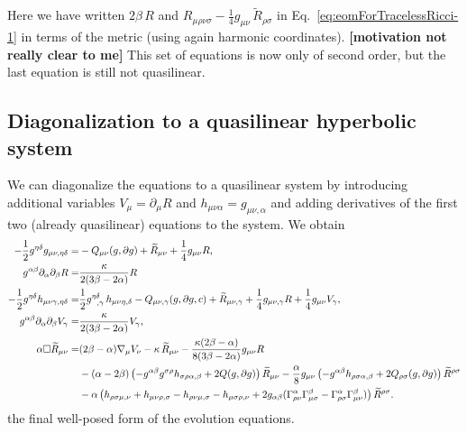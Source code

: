 \documentclass[a4paper,oneside,openany,11pt]{memoir}
\numberwithin{equation}{section} %
\newcommand{\aaron}[1]{{\color{OliveGreen} #1}}
\begin{document}
Here we have written $2\beta\,R$ and $R_{\mu\rho\nu\sigma} -\frac{1}{4} g_{\mu\nu}\, \widetilde{R}_{\rho\sigma}$ in Eq.~\eqref{eq:eomForTracelessRicci-1} in terms of the metric (using again harmonic coordinates). 
\textbf{\aaron{[motivation not really clear to me]}}
This set of equations is now only of second order, but the last equation is still not quasilinear.

\subsection{Diagonalization to a quasilinear hyperbolic system}
We can diagonalize the equations to a quasilinear system by introducing additional variables $V_\mu = \partial_\mu R$ and $h_{\mu\nu\alpha} = g_{\mu\nu,\alpha}$ and adding derivatives of the first two (already quasilinear) equations to the system. We obtain
\begin{align}
	-\frac{1}{2}g^{\eta\delta}g_{\mu\nu,\eta\delta}=
	&-Q_{\mu\nu}(g,\partial g)+\widetilde{R}_{\mu\nu} + \frac{1}{4}g_{\mu\nu}R,
	\\
	g^{\alpha\beta}\partial_{\alpha}\partial_{\beta}R=
	&\frac{\kappa}{2(3\beta-2\alpha)}R
	\\
	-\frac{1}{2}g^{\eta\delta}h_{\mu\nu\gamma,\eta\delta}=
	&\frac{1}{2}g^{\eta\delta}_{\,\,\,\,,\gamma}\,h_{\mu\nu\eta,\delta}-Q_{\mu\nu,\gamma}(g,\partial g, c)+\widetilde{R}_{\mu\nu,\gamma}
	+\frac{1}{4}g_{\mu\nu,\gamma}R+\frac{1}{4}g_{\mu\nu}V_\gamma,
	\\
	g^{\alpha\beta}\partial_{\alpha}\partial_{\beta}V_\gamma=
	&\frac{\kappa}{2(3\beta-2\alpha)}V_\gamma,
	\\
	\alpha \square \widetilde R_{\mu\nu}=
	&(2\beta-\alpha) \nabla_{\mu}V_\nu
	-\kappa\,\widetilde{R}_{\mu\nu}
	-\frac{\kappa(2\beta-\alpha)}{8(3\beta-2\alpha)}g_{\mu\nu}R 
	\\\notag
	&-(\alpha-2\beta)\left(-g^{\alpha\beta}g^{\sigma\rho}h_{\sigma\rho\alpha,\beta}+2Q(g,\partial g)\right)\widetilde{R}_{\mu\nu}
	-\frac{\alpha}{8} g_{\mu\nu}\left(-g^{\alpha\beta}h_{\rho\sigma\alpha,\beta}+2Q_{\rho\sigma}(g,\partial g)\right)\widetilde{R}^{\rho\sigma}
	\\\notag
	&-\alpha \left(h_{\rho\sigma\mu,\nu} +h_{\mu\nu\rho,\sigma}-h_{\rho\nu\mu,\sigma} -h_{\mu\sigma\rho,\nu}+2g_{\alpha\beta}(\Gamma^{\alpha}_{\rho\nu}\Gamma^{\beta}_{\mu\sigma}-\Gamma_{\rho\sigma}^{\alpha}\Gamma_{\mu\nu}^{\beta})\right)\widetilde{R}^{\rho\sigma}.
\end{align}
the final well-posed form of the evolution equations.
\end{document}
